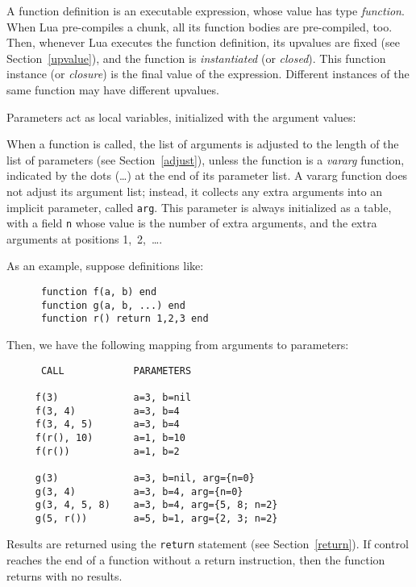 \documentclass[11pt]{article}
\newcommand{\See}[1]{Section~\ref{#1}}
\newcommand{\see}[1]{(see \See{#1})}
\newcommand{\T}[1]{{\tt #1}}
\newcommand{\Index}[1]{#1\index{#1}}
\newcommand{\IndexVerb}[1]{\T{#1}\index{#1}}
\newcommand{\Def}[1]{\emph{#1}\index{#1}}
\begin{document}
A function definition is an executable expression,
whose value has type \emph{function}.
When Lua pre-compiles a chunk,
all its function bodies are pre-compiled, too.
Then, whenever Lua executes the function definition,
its upvalues are fixed \see{upvalue},
and the function is \emph{instantiated} (or \emph{closed}).
This function instance (or \emph{closure})
is the final value of the expression.
Different instances of the same function
may have different upvalues.

Parameters act as local variables,
initialized with the argument values:
\begin{Produc}
\end{Produc}
\label{vararg}
When a function is called,
the list of \Index{arguments} is adjusted to
the length of the list of parameters \see{adjust},
unless the function is a \Def{vararg} function,
indicated by the dots (\ldots) at the end of its parameter list.
A vararg function does not adjust its argument list;
instead, it collects any extra arguments into an implicit parameter,
called \IndexVerb{arg}.
This parameter is always initialized as a table,
with a field \verb|n| whose value is the number of extra arguments,
and the extra arguments at positions 1,~2,~\ldots.

As an example, suppose definitions like:
\begin{verbatim}
      function f(a, b) end
      function g(a, b, ...) end
      function r() return 1,2,3 end
\end{verbatim}
Then, we have the following mapping from arguments to parameters:
\begin{verbatim}
      CALL            PARAMETERS

     f(3)             a=3, b=nil
     f(3, 4)          a=3, b=4
     f(3, 4, 5)       a=3, b=4
     f(r(), 10)       a=1, b=10
     f(r())           a=1, b=2

     g(3)             a=3, b=nil, arg={n=0}
     g(3, 4)          a=3, b=4, arg={n=0}
     g(3, 4, 5, 8)    a=3, b=4, arg={5, 8; n=2}
     g(5, r())        a=5, b=1, arg={2, 3; n=2}
\end{verbatim}

Results are returned using the \verb|return| statement \see{return}.
If control reaches the end of a function without a return instruction,
then the function returns with no results.
\end{document}
